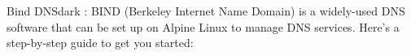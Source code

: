 \label{Bind DNS}
\begin{baseBoxThree}{Bind DNS}{dark}
    \bigskip
    : BIND (Berkeley Internet Name Domain) is a widely-used DNS software that can be set up on Alpine Linux to manage DNS services.
    Here’s a step-by-step guide to get you started:
    \bigskip

\end{baseBoxThree}